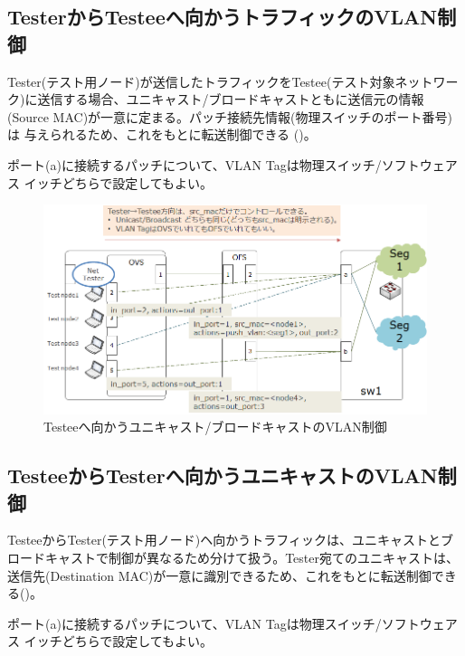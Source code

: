   \subsection{TesterからTesteeへ向かうトラフィックのVLAN制御}
  \label{sec:vlan-ctrl-tester2testee}

Tester(テスト用ノード)が送信したトラフィックをTestee(テスト対象ネットワー
ク)に送信する場合、ユニキャスト/ブロードキャストともに送信元の情報
(Source MAC)が一意に定まる。パッチ接続先情報(物理スイッチのポート番号)は
与えられるため、これをもとに転送制御できる
()。

ポート(a)に接続するパッチについて、VLAN Tagは物理スイッチ/ソフトウェアス
イッチどちらで設定してもよい。

\begin{figure}[h]
 \centering
 \includegraphics[scale=0.6]{img/vlan-tester2testee.png}
 \caption{Testeeへ向かうユニキャスト/ブロードキャストのVLAN制御}
 \label{fig:vlan-tester2testee}
\end{figure}

  \subsection{TesteeからTesterへ向かうユニキャストのVLAN制御}
  \label{sec:vlan-ctrl-testee2tester-unicast}

TesteeからTester(テスト用ノード)ヘ向かうトラフィックは、ユニキャストとブ
ロードキャストで制御が異なるため分けて扱う。Tester宛てのユニキャストは、
送信先(Destination MAC)が一意に識別できるため、これをもとに転送制御でき
る()。

ポート(a)に接続するパッチについて、VLAN Tagは物理スイッチ/ソフトウェアス
イッチどちらで設定してもよい。

